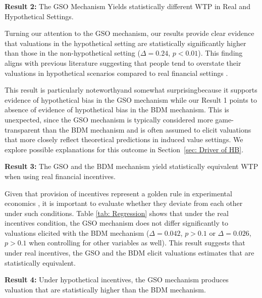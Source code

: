 \documentclass[12pt]{article}
\begin{document}
 
\vspace{0.5cm}

\textbf{Result 2:} The GSO Mechanism Yields statistically different WTP in Real and Hypothetical Settings. 

Turning our attention to the GSO mechanism, our results provide clear evidence that valuations in the hypothetical setting are statistically significantly higher than those in the non-hypothetical setting (\(\Delta = 0.24\), \(p < 0.01\)). This finding aligns with previous literature suggesting that people tend to overstate their valuations in hypothetical scenarios compared to real financial settings \citep{penn2018understanding, fang_use_2021}. 

This result is particularly noteworthy\textemdash and somewhat surprising\textemdash because it supports evidence of hypothetical bias in the GSO mechanism while our Result 1 points to absence of evidence of hypothetical bias  in the BDM mechanism. This is unexpected, since the GSO mechanism is typically considered more game-transparent than the BDM mechanism and is often assumed to elicit valuations that more closely reflect theoretical predictions in induced value settings. We explore possible explanations for this outcome in Section~\ref{sec: Driver of HB}.

\vspace{0.5cm}



\textbf{Result 3:} The GSO and the BDM mechanism yield statistically equivalent WTP when using real financial incentives. 

Given that provision of incentives represent a golden rule in experimental economics \citep{smith_experimental_1976}, it is important to evaluate whether they deviate from each other under such conditions. Table \ref{tab: Regression} shows that under the real incentives condition, the GSO mechanism does not differ significantly to valuations elicited with the BDM mechanism (\(\Delta = 0.042\), \(p > 0.1\) or \(\Delta = 0.026\), \(p > 0.1\) when controlling for other variables as well). This result suggests that under real incentives, the GSO and the BDM elicit valuations estimates that are statistically equivalent.

\vspace{0.5cm}

\textbf{Result 4:} Under hypothetical incentives, the GSO mechanism produces valuation that are statistically higher than the BDM mechanism.
\end{document}
